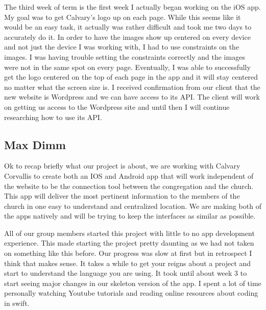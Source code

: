 \documentclass[letterpaper,10pt,draftclsnofoot,onecolumn,titlepage]{IEEEtran}
\begin{document}
	The third week of term is the first week I actually began working on the iOS app. 
	My goal was to get Calvary's logo up on each page. 
	While this seems like it would be an easy task, it actually was rather difficult and took me two days to accurately do it. 
	In order to have the images show up centered on every device and not just the device I was working with, I had to use constraints on the images. 
	I was having trouble setting the constraints correctly and the images were not in the same spot on every page. 
	Eventually, I was able to successfully get the logo centered on the top of each page in the app and it will stay centered no matter what the screen size is. 
	I received confirmation from our client that the new website is Wordpress and we can have access to its API. 
	The client will work on getting us access to the Wordpress site and until then I will continue researching how to use its API. 
	
	
	
	
	\subsection{Max Dimm}
	Ok to recap briefly what our project is about, we are working with Calvary Corvallis to create both an IOS and Android app that will work independent of the website to be the connection tool between the congregation and the church. 
This app will deliver the most pertinent information to the members of the church in one easy to understand and centralized location. We are making both of the apps natively and will be trying to keep the interfaces as similar as possible. 

	All of our group members started this project with little to no app development experience. 
This made starting the project pretty daunting as we had not taken on something like this before. Our progress was slow at first but in retrospect I think that makes sense. 
It takes a while to get your reigns about a project and start to understand the language you are using. 
It took until about week 3 to start seeing major changes in our skeleton version of the app. 
I spent a lot of time personally watching Youtube tutorials and reading online resources about coding in swift. 
\end{document}
